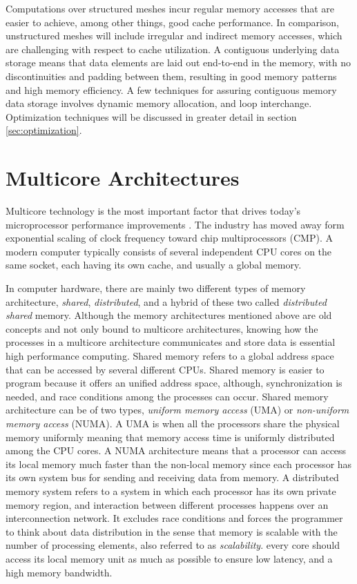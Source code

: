 Computations over structured meshes incur regular memory accesses that are easier to achieve, among other things, good cache performance. In comparison, unstructured meshes will include irregular and indirect memory accesses, which are challenging with respect to cache utilization.
A contiguous underlying data storage means that data elements are laid out end-to-end in the memory, with no discontinuities and padding between them, resulting in good memory patterns and high memory efficiency. A few techniques for assuring contiguous memory data storage involves dynamic memory allocation, and loop interchange. Optimization techniques will be discussed in greater detail in section \ref{sec:optimization}. 


\section{Multicore Architectures}
\label{sec:multicore_architectures}
Multicore technology is the most important factor that drives today’s microprocessor performance improvements \cite{article6}. The industry has moved away form exponential scaling of clock frequency toward chip multiprocessors (CMP). A modern computer typically consists of several independent CPU cores on the same socket, each having its own cache, and usually a global memory.  

In computer hardware, there are mainly two different types of memory architecture, \textit{shared}, \textit{distributed}, and a hybrid of these two called \textit{distributed shared} memory. Although the memory architectures mentioned above are old concepts and not only bound to multicore architectures, knowing how the processes in a multicore architecture communicates and store data is essential high performance computing. Shared memory refers to a global address space that can be accessed by several different CPUs. Shared memory is easier to program because it offers an unified address space, although, synchronization is needed, and race conditions among the processes can occur. Shared memory architecture can be of two types, \textit{uniform memory access} (UMA) or \textit{non-uniform memory access} (NUMA). A UMA is when all the processors share the physical memory uniformly \cite{article8} meaning that memory access time is uniformly distributed among the CPU cores. A NUMA architecture means that a processor can access its local memory much faster than the non-local memory since each processor has its own system bus for sending and receiving data from memory. A distributed memory system refers to a system in which each processor has its own private memory region, and interaction between different processes happens over an interconnection network. It excludes race conditions and forces the programmer to think about data distribution in the sense that memory is scalable with the number of processing elements, also referred to as \textit{scalability}. every core should access its local memory unit as much as possible to ensure low latency, and a high memory bandwidth. 

